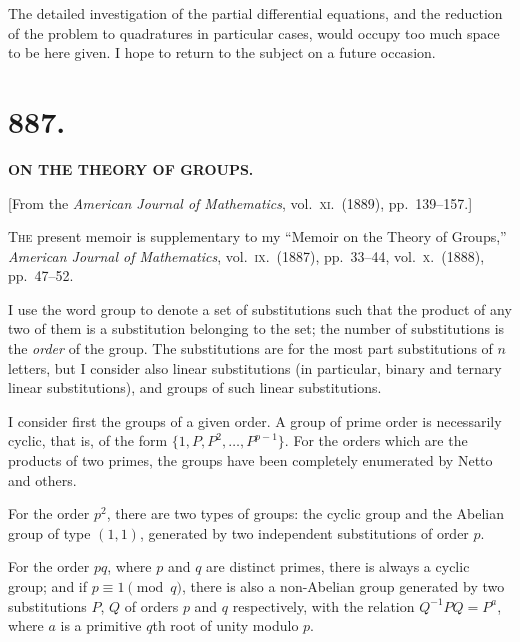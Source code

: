 \documentclass[11pt,a4paper]{book}
\begin{document}
The detailed investigation of the partial differential equations, and the reduction of the problem to quadratures in particular cases, would occupy too much space to be here given. I hope to return to the subject on a future occasion.


\newpage
\section*{887.}

\begin{center}
\textbf{ON THE THEORY OF GROUPS.}
\end{center}

\begin{center}
[From the \textit{American Journal of Mathematics}, vol.\ \textsc{xi}.\ (1889), pp.\ 139--157.]
\end{center}

\textsc{The} present memoir is supplementary to my ``Memoir on the Theory of Groups,'' \textit{American Journal of Mathematics}, vol.~\textsc{ix}.\ (1887), pp.\ 33--44, vol.~\textsc{x}.\ (1888), pp.\ 47--52.

I use the word group to denote a set of substitutions such that the product of any two of them is a substitution belonging to the set; the number of substitutions is the \textit{order} of the group. The substitutions are for the most part substitutions of $n$ letters, but I consider also linear substitutions (in particular, binary and ternary linear substitutions), and groups of such linear substitutions.

I consider first the groups of a given order. A group of prime order is necessarily cyclic, that is, of the form $\{1, P, P^2, \ldots, P^{p-1}\}$. For the orders which are the products of two primes, the groups have been completely enumerated by Netto and others.

For the order $p^2$, there are two types of groups: the cyclic group and the Abelian group of type $(1,1)$, generated by two independent substitutions of order $p$.

For the order $pq$, where $p$ and $q$ are distinct primes, there is always a cyclic group; and if $p \equiv 1 \pmod{q}$, there is also a non-Abelian group generated by two substitutions $P$, $Q$ of orders $p$ and $q$ respectively, with the relation $Q^{-1}PQ = P^a$, where $a$ is a primitive $q$th root of unity modulo $p$.
\end{document}
